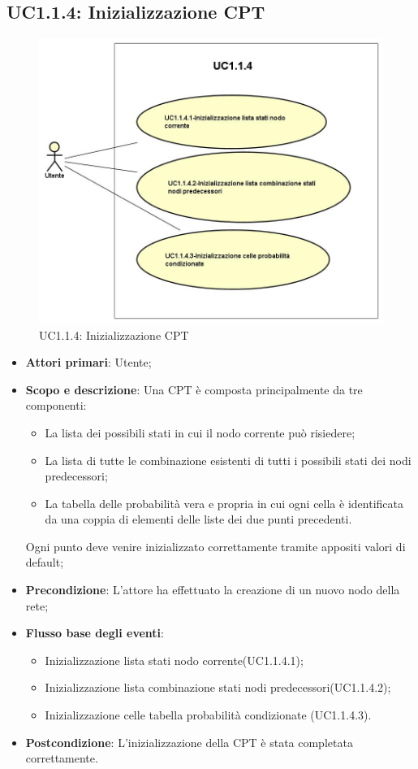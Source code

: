 \subsection{UC1.1.4: Inizializzazione CPT} 
\begin{figure} [H]
	\centering
	\includegraphics[scale=0.45]{Img/UC1-1-4} 
	\caption{UC1.1.4: Inizializzazione CPT} \label{} 
\end{figure} 
\begin{itemize} 
	\item{\textbf{Attori primari}: Utente;} 
	\item{\textbf{Scopo e descrizione}: Una CPT è composta principalmente da tre componenti: 
		\begin{itemize} 
			\item{La lista dei possibili stati in cui il nodo corrente può risiedere;} 
			\item{La lista di tutte le combinazione esistenti di tutti i possibili stati dei nodi predecessori;} 
			\item{La tabella delle probabilità vera e propria in cui ogni cella è identificata da una coppia di elementi delle liste dei due punti precedenti.} 
		\end{itemize} 			
		Ogni punto deve venire inizializzato correttamente tramite appositi valori di default;
	} 
	\item{\textbf{Precondizione}: L'attore ha effettuato la creazione di un nuovo nodo della rete;} 
	\item{\textbf{Flusso base degli eventi}: } 
	\begin{itemize} 
		\item{Inizializzazione lista stati nodo corrente(UC1.1.4.1);} 
		\item{Inizializzazione lista combinazione stati nodi predecessori(UC1.1.4.2);} 
		\item{Inizializzazione celle tabella probabilità condizionate (UC1.1.4.3).} 
	\end{itemize} 
	\item{\textbf{Postcondizione}: L'inizializzazione della CPT è stata completata correttamente.} 
\end{itemize} 
